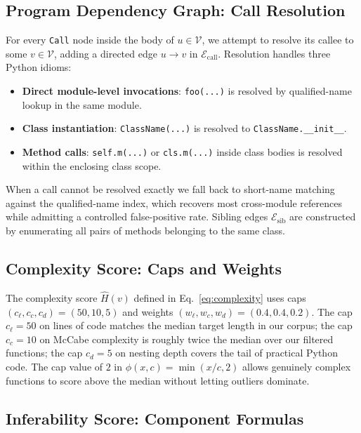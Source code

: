 \subsection{Program Dependency Graph: Call Resolution}
\label{app:algo:pdg}

For every \texttt{Call} node inside the body of $u \in \mathcal{V}$, we
attempt to resolve its callee to some $v \in \mathcal{V}$, adding a
directed edge $u \to v$ in $\mathcal{E}_{\mathrm{call}}$. Resolution
handles three Python idioms:
\begin{itemize}\setlength\itemsep{0.1em}
  \item \textbf{Direct module-level invocations}: \texttt{foo(...)} is
        resolved by qualified-name lookup in the same module.
  \item \textbf{Class instantiation}: \texttt{ClassName(...)} is
        resolved to \texttt{ClassName.\_\_init\_\_}.
  \item \textbf{Method calls}: \texttt{self.m(...)} or \texttt{cls.m(...)}
        inside class bodies is resolved within the enclosing class scope.
\end{itemize}
When a call cannot be resolved exactly we fall back to short-name
matching against the qualified-name index, which recovers most
cross-module references while admitting a controlled false-positive rate.
Sibling edges $\mathcal{E}_{\mathrm{sib}}$ are constructed by
enumerating all pairs of methods belonging to the same class.

\subsection{Complexity Score: Caps and Weights}
\label{app:algo:hyperparams}

The complexity score $\hat{H}(v)$ defined in Eq.~\eqref{eq:complexity}
uses caps $(c_{\ell}, c_{c}, c_{d}) = (50, 10, 5)$ and weights
$(w_{\ell}, w_{c}, w_{d}) = (0.4, 0.4, 0.2)$. The cap $c_{\ell}=50$
on lines of code matches the median target length in our corpus; the
cap $c_c=10$ on McCabe complexity is roughly twice the median over our
filtered functions; the cap $c_d=5$ on nesting depth covers the tail of
practical Python code. The cap value of $2$ in $\phi(x,c)=\min(x/c,2)$
allows genuinely complex functions to score above the median without
letting outliers dominate.

\subsection{Inferability Score: Component Formulas}
\label{app:algo:inferability}

